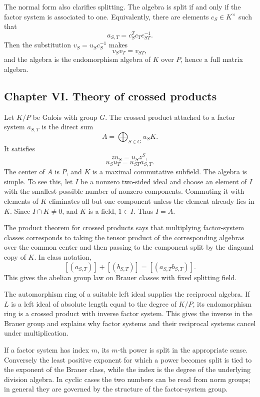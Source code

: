 \documentclass[11pt]{article}
\begin{document}
The normal form also clarifies splitting. The algebra is split if and only if the factor system is associated to one. Equivalently, there are elements \(c_S\in K^{\times}\) such that
\[
  a_{S,T}=c_S^Tc_Tc_{ST}^{-1}.
\]
Then the substitution \(v_S=u_Sc_S^{-1}\) makes
\[
  v_Sv_T=v_{ST},
\]
and the algebra is the endomorphism algebra of \(K\) over \(P\), hence a full matrix algebra.

\subsection{Chapter VI. Theory of crossed products}

Let \(K/P\) be Galois with group \(G\). The crossed product attached to a factor system \(a_{S,T}\) is the direct sum
\[
  A=\bigoplus_{S\in G}u_SK.
\]
It satisfies
\[
  z u_S=u_S z^S,
\]
\[
  u_Su_T=u_{ST}a_{S,T}.
\]
The center of \(A\) is \(P\), and \(K\) is a maximal commutative subfield. The algebra is simple. To see this, let \(I\) be a nonzero two-sided ideal and choose an element of \(I\) with the smallest possible number of nonzero components. Commuting it with elements of \(K\) eliminates all but one component unless the element already lies in \(K\). Since \(I\cap K\ne0\), and \(K\) is a field, \(1\in I\). Thus \(I=A\).

The product theorem for crossed products says that multiplying factor-system classes corresponds to taking the tensor product of the corresponding algebras over the common center and then passing to the component split by the diagonal copy of \(K\). In class notation,
\[
  [(a_{S,T})]+[(b_{S,T})]=[(a_{S,T}b_{S,T})].
\]
This gives the abelian group law on Brauer classes with fixed splitting field.

The automorphism ring of a suitable left ideal supplies the reciprocal algebra. If \(L\) is a left ideal of absolute length equal to the degree of \(K/P\), its endomorphism ring is a crossed product with inverse factor system. This gives the inverse in the Brauer group and explains why factor systems and their reciprocal systems cancel under multiplication.

If a factor system has index \(m\), its \(m\)-th power is split in the appropriate sense. Conversely the least positive exponent for which a power becomes split is tied to the exponent of the Brauer class, while the index is the degree of the underlying division algebra. In cyclic cases the two numbers can be read from norm groups; in general they are governed by the structure of the factor-system group.
\end{document}
